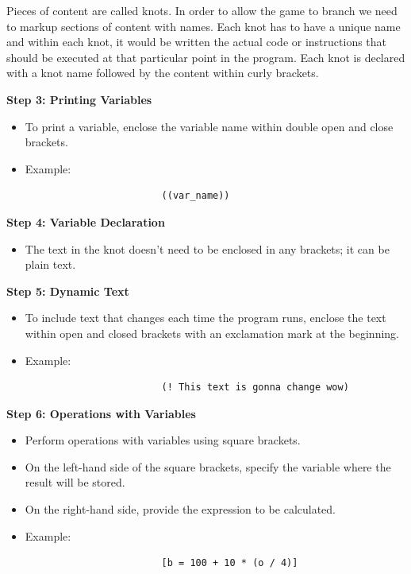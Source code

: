 \noindent Pieces of content are called knots. In order to allow the game to branch we need to markup sections of content with names. Each knot has to have a unique name and within each knot, it would be written the actual code or instructions that should be executed at that particular point in the program. Each knot is declared with a knot name followed by the content within curly brackets.

  \noindent \textbf{Step 3: Printing Variables}
 \begin{itemize}
                \item To print a variable, enclose the variable name within double open and close brackets.
                \item Example: \begin{verbatim}
                    	((var_name))
                      \end{verbatim}
 \end{itemize}


  \noindent \textbf{Step 4: Variable Declaration}
 \begin{itemize}
                \item The text in the knot doesn't need to be enclosed in any brackets; it can be plain text.

 \end{itemize}

   \noindent \textbf{Step 5: Dynamic Text}
 \begin{itemize}
                \item To include text that changes each time the program runs, enclose the text within open and closed brackets with an exclamation mark at the beginning.
                \item Example: \begin{verbatim}
                        (! This text is gonna change wow)
                      \end{verbatim}
 \end{itemize}


   \noindent \textbf{Step 6: Operations with Variables}
 \begin{itemize}
                \item Perform operations with variables using square brackets.
                \item On the left-hand side of the square brackets, specify the variable where the result will be stored.
                \item On the right-hand side, provide the expression to be calculated.
                \item Example: \begin{verbatim}
                        [b = 100 + 10 * (o / 4)]
                      \end{verbatim}
 \end{itemize}


